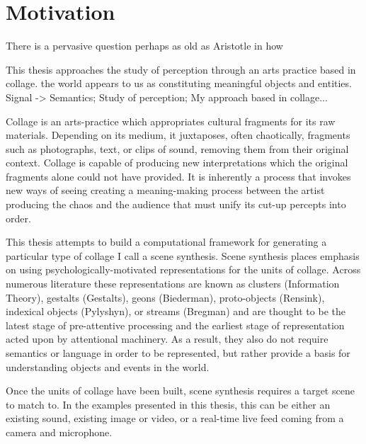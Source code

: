 \documentclass[a4paper,11pt,final]{ThesisStyle}
\begin{document}
\section{Motivation}

There is a pervasive question perhaps as old as Aristotle in how 

This thesis approaches the study of perception through an arts practice based in collage.  the world appears to us as constituting meaningful objects and entities.  Signal -> Semantics; Study of perception; My approach based in collage... 

Collage is an arts-practice which appropriates cultural fragments for its raw materials.  Depending on its medium, it juxtaposes, often chaotically, fragments such as photographs, text, or clips of sound, removing them from their original context.  Collage is capable of producing new interpretations which the original fragments alone could not have provided.  It is inherently a process that invokes new ways of seeing creating a meaning-making process between the artist producing the chaos and the audience that must unify its cut-up percepts into order.  %


This thesis attempts to build a computational framework for generating a particular type of collage I call a scene synthesis.  Scene synthesis places emphasis on using psychologically-motivated representations for the units of collage.  Across numerous literature these representations are known as clusters (Information Theory), gestalts (Gestalts), geons (Biederman), proto-objects (Rensink), indexical objects (Pylyshyn), or streams (Bregman) and are thought to be the latest stage of pre-attentive processing and the earliest stage of representation acted upon by attentional machinery.  As a result, they also do not require semantics or language in order to be represented, but rather provide a basis for understanding objects and events in the world.  

Once the units of collage have been built, scene synthesis requires a target scene to match to.  In the examples presented in this thesis, this can be either an existing sound, existing image or video, or a real-time live feed coming from a camera and microphone.   
\end{document}
